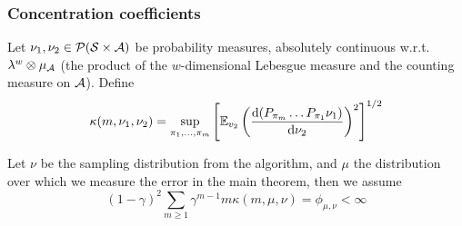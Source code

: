 \subsubsection{Concentration coefficients}

\begin{defn} \label{defn:ccoefs}
  Let $\nu_1, \nu_2 \in \mathcal{P}(\mathcal{S}\times \mathcal{A})$ be probability measures,
  absolutely continuous w.r.t. $\lambda^w \otimes \mu_\mathcal{A}$
  (the product of the $w$-dimensional Lebesgue measure and the counting measure
  on $\mathcal{A}$).
  Define
  \[ \kappa(m, \nu_1, \nu_2) = \sup_{\pi_1, \dots, \pi_m}
    \left[ \mathbb{E}_{v_2} \left( \frac{\mathrm{d} (P_{\pi_m} \dots P_{\pi_1} \nu_1)}
  {\mathrm{d} \nu_2} \right)^2 \right]^{1/2} \]
\end{defn}

\begin{asm}\label{asm:A2}
  Let $\nu$ be the sampling distribution from the algorithm, and $\mu$ the distribution
  over which we measure the error in the main theorem, then we assume
  \[ (1 - \gamma)^2 \sum_{m\geq 1} \gamma^{m-1} m \kappa(m, \mu, \nu)
  = \phi_{\mu, \nu} < \infty \]
\end{asm}


